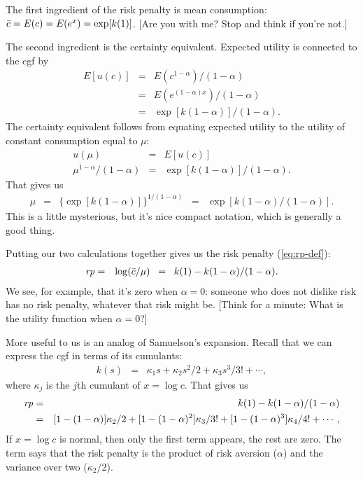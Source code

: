 \documentclass[11pt]{article}
\begin{document}
The first ingredient of the risk penalty is mean consumption:
$\bar{c} = E(c) = E (e^x) = \exp[k(1)]$.
[Are you with me?  Stop and think if you're not.]

The second ingredient is the certainty equivalent.
Expected utility is connected to the cgf by
\begin{eqnarray*}
    E[u(c)] &=&   E (c^{1-\alpha})/(1-\alpha) \\
            &=& E (e^{(1-\alpha) x})/(1-\alpha) \\
            &=&  \exp[k(1-\alpha)]/(1-\alpha) .
\end{eqnarray*}
The certainty equivalent follows from equating expected utility to the utility
of constant consumption equal to $\mu$:
\begin{eqnarray*}
    u (\mu) &=& E [u(c)]  \\
    \mu^{1-\alpha}/(1-\alpha)
            &=& \exp[k(1-\alpha)]/(1-\alpha) .
\end{eqnarray*}
That gives us
\begin{eqnarray*}
    \mu &=&  \big\{ \exp[k(1-\alpha)] \big\} ^{1/(1-\alpha)}  \;\;=\;\; \exp[k(1-\alpha)/(1-\alpha)]  .
\end{eqnarray*}
This is a little mysterious, but it's nice compact notation,
which is generally a good thing.

Putting our two calculations together gives us the risk penalty (\ref{eq:rp-def}):
\begin{eqnarray*}
    \mbox{\em rp\/} &=& \log (\bar{c}/\mu)  \;\;=\;\; k(1) -  k(1-\alpha) / (1-\alpha) .
\end{eqnarray*}
We see, for example, that it's zero when $\alpha = 0$:
someone who does not dislike risk has no risk penalty,
whatever that risk might be.
[Think for a minute:  What is the utility function when $\alpha = 0$?]

More useful to us is an analog of Samuelson's expansion.
Recall that we can express the cgf in terms of its cumulants:
\begin{eqnarray*}
    k(s) &=& \kappa_1 s + \kappa_2 s^2/2 + \kappa_3 s^3/3! + \cdots ,
\end{eqnarray*}
where $\kappa_j$ is the $j$th cumulant of $x = \log c$.
That gives us
\begin{eqnarray}
    \mbox{\em rp\/} &=& k(1) -  k(1-\alpha)/(1-\alpha) \nonumber \\
        &=& [1-(1-\alpha)] \kappa_2/2 + [1- (1-\alpha)^2] \kappa_3/3!
            + [1- (1-\alpha)^3] \kappa_4/4! + \cdots ,
        \label{eq:rp-cum-expansion}
\end{eqnarray}
If $x = \log c$ is normal, then only the first term appears,
the rest are zero.
The term says that the risk penalty is the product of risk aversion ($\alpha$)
and the variance over two ($\kappa_2/2$).
\end{document}
